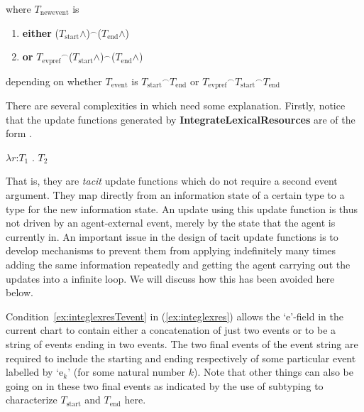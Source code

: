 \begin{ex}
\medskip                                                                                                                       

where $T_{\mathrm{newevent}}$ is 
\begin{enumerate}
\item []\textbf{either} 
($T_{\mathrm{start}}$\d{$\wedge$})$^{\frown}$($T_{\mathrm{end}}$\d{$\wedge$})

\item []\textbf{or} 
${T_{\mathrm{evpref}}}^{\frown}$($T_{\mathrm{start}}$\d{$\wedge$})$^{\frown}$($T_{\mathrm{end}}$\d{$\wedge$})
\end{enumerate}
depending on whether $T_{\mathrm{event}}$ is ${T_{\mathrm{start}}}^{\frown}T_{\mathrm{end}}$ or
${T_{\mathrm{evpref}}}^{\frown}{T_{\mathrm{start}}}^{\frown}T_{\mathrm{end}}$ 
\label{ex:integlexres}
\end{ex} 
There are several complexities in \preveg{} which need some
explanation.  Firstly, notice that the update functions generated by
\textbf{IntegrateLexicalResources} are of the form \nexteg{}.
\begin{ex} 
$\lambda r$:$T_1$ . $T_2$ 
\end{ex} 
That is, they are \textit{tacit} update functions which do not require
a second event argument.  They map directly from an information state
of a certain type to a type for the new information state.  An update
using this update function is thus not driven by an agent-external
event, merely by the state that the agent is currently in. An
important issue in the design of tacit update functions is to develop
mechanisms to prevent them from applying indefinitely many times
adding the same information repeatedly and getting the agent carrying
out the updates into a infinite loop.  We will discuss how this has
been avoided here below.

Condition~\ref{ex:integlexresTevent} in (\ref{ex:integlexres}) allows
the `e'-field in the current chart to contain either a concatenation
of just two events or to be a string of events ending in two events.
The two final events of the event string are required to include the
starting and ending respectively of some particular event labelled by
`e$_k$' (for some natural number $k$).  Note that other things can
also be going on in these two final events as indicated by the use of
subtyping to characterize $T_{\mathrm{start}}$ and $T_{\mathrm{end}}$
here.

